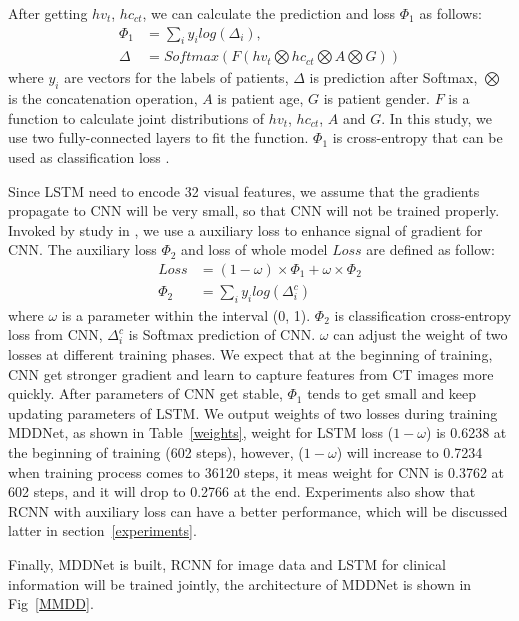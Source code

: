 After getting $hv_t$, $hc_{ct}$, we can calculate the prediction and loss $\Phi_1$ as follows:
\begin{align*}\label{classifyandloss1}
    \Phi_1 &= \sum_i{y_i log(\Delta_i)}, \\
    \Delta &= Softmax(F(hv_t \bigotimes hc_{ct} \bigotimes A \bigotimes G))
\end{align*}
where $y_i$ are vectors for the labels of patients, $\Delta$ is prediction after Softmax, $\bigotimes$ is the concatenation operation, $A$ is patient age, $G$ is patient gender. $F$ is a function to calculate joint distributions of $hv_t$, $hc_{ct}$, $A$ and $G$. In this study, we use two fully-connected layers to fit the function. $\Phi_1$ is cross-entropy that can be used as classification loss \cite{Zreik2018A}.

Since LSTM need to encode 32 visual features, we assume that the gradients propagate to CNN will be very small, so that CNN will not be trained properly. Invoked by study in \cite{szegedy2016rethinking}, we use a auxiliary loss to enhance signal of gradient for CNN.
The auxiliary loss $\Phi_2$ and loss of whole model $Loss$ are defined as follow: 
\begin{align*}
Loss &=  (1 - \omega) \times \Phi_1 +  \omega \times \Phi_2 \\
\Phi_2 &= \sum_i{y_i log(\Delta^c_i)}
\end{align*}
where $\omega$ is a parameter within the interval (0, 1). $\Phi_2$ is classification cross-entropy loss from CNN, $\Delta^c_i$ is Softmax prediction of CNN. $\omega$ can adjust the weight of two losses at different training phases.
We expect that at the beginning of training, CNN get stronger gradient and learn to capture features from CT images more quickly. After parameters of CNN get stable, $\Phi_1$ tends to get small and keep updating parameters of LSTM. We output weights of two losses during training MDDNet, as shown in Table~\ref{weights}, weight for LSTM loss ($1 - \omega$) is 0.6238 at the beginning of training (602 steps), however, ($1 - \omega$) will increase to 0.7234 when training process comes to 36120 steps, it meas weight for CNN is 0.3762 at 602 steps, and it will drop to 0.2766 at the end. Experiments also show that RCNN with auxiliary loss can have a better performance, which will be discussed latter in section~\ref{experiments}.

Finally, MDDNet is built, RCNN for image data and LSTM for clinical information will be trained jointly, the architecture of MDDNet is shown in Fig~\ref{MMDD}. 

